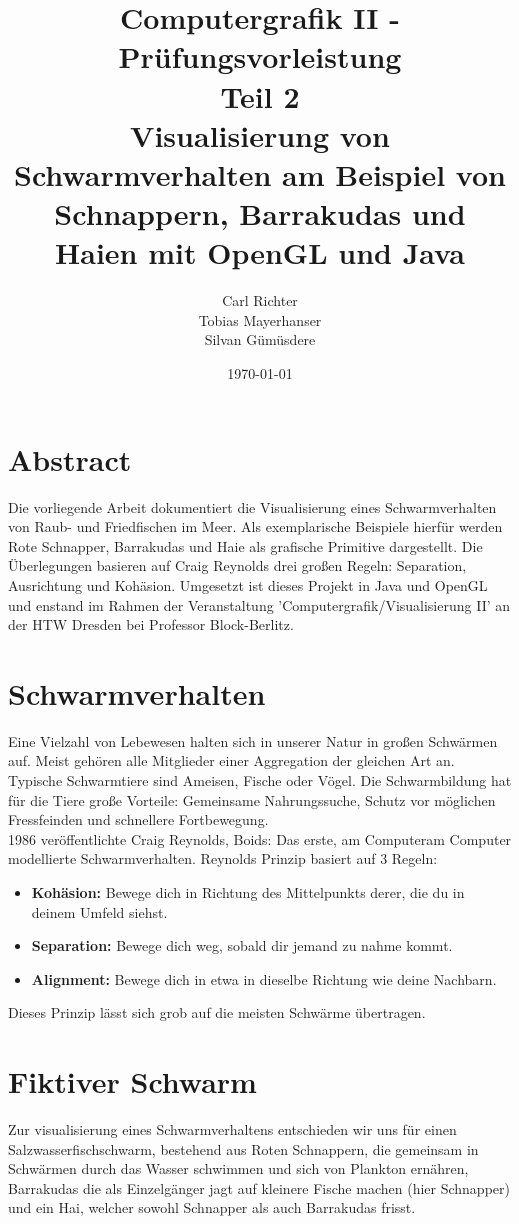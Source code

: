 \documentclass[11pt]{article}
\title{\textbf{Computergrafik II - Prüfungsvorleistung}\\Teil 2\\Visualisierung von Schwarmverhalten am Beispiel von Schnappern, Barrakudas und Haien mit OpenGL und Java}
\date{\today}
\author{Carl Richter\\
		Tobias Mayerhanser\\
		Silvan Gümüsdere}
\begin{document}
\maketitle
\newpage
\tableofcontents
\newpage
\section{Abstract}
Die vorliegende Arbeit dokumentiert die Visualisierung eines Schwarmverhalten von Raub- und Friedfischen im Meer. Als exemplarische Beispiele hierfür werden Rote Schnapper, Barrakudas und Haie als grafische Primitive dargestellt. Die Überlegungen basieren auf Craig Reynolds drei großen Regeln: Separation, Ausrichtung und Kohäsion. Umgesetzt ist dieses Projekt in Java und OpenGL und enstand im Rahmen der Veranstaltung 'Computergrafik/Visualisierung II' an der HTW Dresden bei Professor Block-Berlitz.
\section{Schwarmverhalten}
Eine Vielzahl von Lebewesen halten sich in unserer Natur in großen Schwärmen auf. Meist gehören alle Mitglieder einer Aggregation der gleichen Art an. Typische Schwarmtiere sind Ameisen, Fische oder Vögel. Die Schwarmbildung hat für die Tiere große Vorteile: Gemeinsame Nahrungssuche, Schutz vor möglichen Fressfeinden und schnellere Fortbewegung.\\
1986 veröffentlichte Craig Reynolds, Boids: Das erste, am Computeram Computer modellierte Schwarmverhalten. Reynolds Prinzip basiert auf 3 Regeln:
\begin{itemize}
	\item \textbf{Kohäsion:} Bewege dich in Richtung des Mittelpunkts derer, die du in deinem Umfeld siehst.
	\item \textbf{Separation:} Bewege dich weg, sobald dir jemand zu nahme kommt.
	\item \textbf{Alignment:} Bewege dich in etwa in dieselbe Richtung wie deine Nachbarn.
\end{itemize}
Dieses Prinzip lässt sich grob auf die meisten Schwärme übertragen.
\section{Fiktiver Schwarm}
Zur visualisierung eines Schwarmverhaltens entschieden wir uns für einen Salzwasserfischschwarm, bestehend aus Roten Schnappern, die gemeinsam in Schwärmen durch das Wasser schwimmen und sich von Plankton ernähren, Barrakudas die als Einzelgänger jagt auf kleinere Fische machen (hier Schnapper) und ein Hai, welcher sowohl Schnapper als auch Barrakudas frisst.
\end{document}

